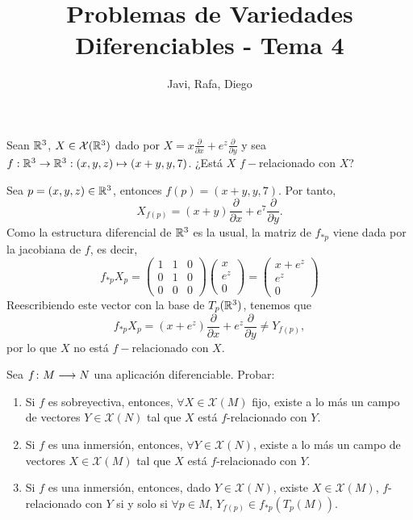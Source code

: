 \documentclass[twoside]{article}
\begin{document}
\title{Problemas de Variedades Diferenciables - Tema 4}
\author{Javi, Rafa, Diego}
\maketitle

\begin{ejercicio}{6}
Sean $\mathbb{R}^3$, $X \in \mathcal{X}(\mathbb{R}^3)$ dado por $X = x\frac{\partial}{\partial x} + e^z\frac{\partial}{\partial y}$ y sea $f :
\mathbb{R}^3 \to \mathbb{R}^3 : (x, y, z) \mapsto (x + y, y, 7)$. ¿Está $X$ $f-$relacionado con $X$?
\end{ejercicio}
\begin{solucion}
Sea $p=(x,y,z)\in\mathbb{R}^3$, entonces $f(p)=(x+y,y,7)$. Por tanto, $$X_{f(p)}=(x+y)\frac{\partial}{\partial x} + e^7\frac{\partial}{\partial y}.$$ 
Como la estructura diferencial de $\mathbb{R}^3$ es la usual, la matriz de $f_{*p}$ viene dada por la jacobiana de $f$, es decir, 
\[f_{*p}X_p=\begin{pmatrix}
1 & 1 & 0\\
0 & 1 & 0\\
0 & 0 & 0
\end{pmatrix}\begin{pmatrix}
x\\
e^z\\
0
\end{pmatrix}=\begin{pmatrix}
x+e^z\\
e^z\\
0
\end{pmatrix}\]
Reescribiendo este vector con la base de $T_p(\mathbb{R}^3)$, tenemos que 
$$f_{*p}X_p=(x+e^z)\frac{\partial}{\partial x} + e^z\frac{\partial}{\partial y}\neq Y_{f(p)},$$
por lo que $X$ no está $f-$relacionado con $X$.
\end{solucion}
\newpage
\begin{ejercicio}{7}
Sea $f\colon{M}\longrightarrow{N}$ una aplicación diferenciable. Probar:
\begin{enumerate}
\item Si $f$ es sobreyectiva, entonces, $\forall X \in \mathcal{X}(M)$ fijo, existe a lo más un campo de vectores $Y\in \mathcal{X}(N)$ tal que $X$ está $f$-relacionado con $Y$. 
\item Si $f$ es una inmersión, entonces, $\forall Y \in \mathcal{X}(N)$, existe a lo más un campo de vectores $X\in \mathcal{X}(M)$ tal que $X$ está $f$-relacionado con $Y$. 
\item Si $f$ es una inmersión, entonces, dado $Y \in \mathcal{X}(N)$, existe $X\in \mathcal{X}(M)$, $f$-relacionado con $Y$ si y solo si $\forall p \in M$, $Y_{f(p)}\in f_{\ast p}(T_p(M))$.
\end{enumerate}
\end{ejercicio}
\end{document}
